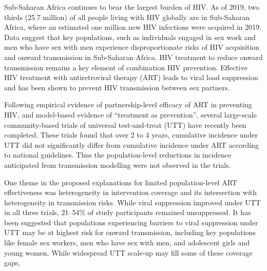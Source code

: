 Sub-Saharan Africa continues to bear the largest burden of HIV.  %
As of 2019, two thirds (25.7 million) of all people living with HIV globally are in Sub-Saharan Africa, where
an estimated one million new HIV infections were acquired in 2019.\cite{AIDSinfo}
Data suggest that key populations, such as individuals engaged in sex work and men who have sex with men experience
disproportionate risks of HIV acquisition and onward transmission in Sub-Saharan Africa.
\cite{Baral2012,Beyrer2012,Mishra2012,Boily2015}
HIV treatment to reduce onward transmission remains a key element of combination HIV prevention.\cite{WHO2016ART}
Effective HIV treatment with antiretroviral therapy (ART) leads to viral load suppression
and has been shown to prevent HIV transmission between sex partners.\cite{Lundgren2015,Danel2015,Cohen2016}
\par
Following empirical evidence of partnership-level efficacy of ART
in preventing HIV,\cite{Lundgren2015,Danel2015,Cohen2016}
and model-based evidence of ``treatment as prevention'',\cite{Granich2009,Eaton2012,Cori2014}
several large-scale community-based trials of universal test-and-treat (UTT)
have recently been completed.\cite{Iwuji2018,Havlir2019,Hayes2019}
These trials found that over 2 to 4 years,
cumulative incidence under UTT did not significantly differ from
cumulative incidence under ART according to national guidelines.\cite{Havlir2019,Hayes2019,Iwuji2018}
Thus the population-level reductions in incidence anticipated from transmission modelling
were not observed in the trials.\cite{Baral2019,Havlir2020}
\par
One theme in the proposed explanations for limited population-level ART effectiveness
was heterogeneity in intervention coverage and its intersection with
heterogeneity in transmission risks.\cite{AbdoolKarim2019,Baral2019}
While viral suppression improved under UTT in all three trials,
21--54\% of study participants remained unsuppressed.\cite{Iwuji2018,Havlir2019,Hayes2019}
It has been suggested that populations experiencing barriers to viral suppression under UTT
may be at highest risk for onward transmission, including key populations like
female sex workers, men who have sex with men, and adolescent girls and young women.%
\cite{Hakim2018,Nyato2019,Green2020}
While widespread UTT scale-up may fill some of these coverage gaps,
